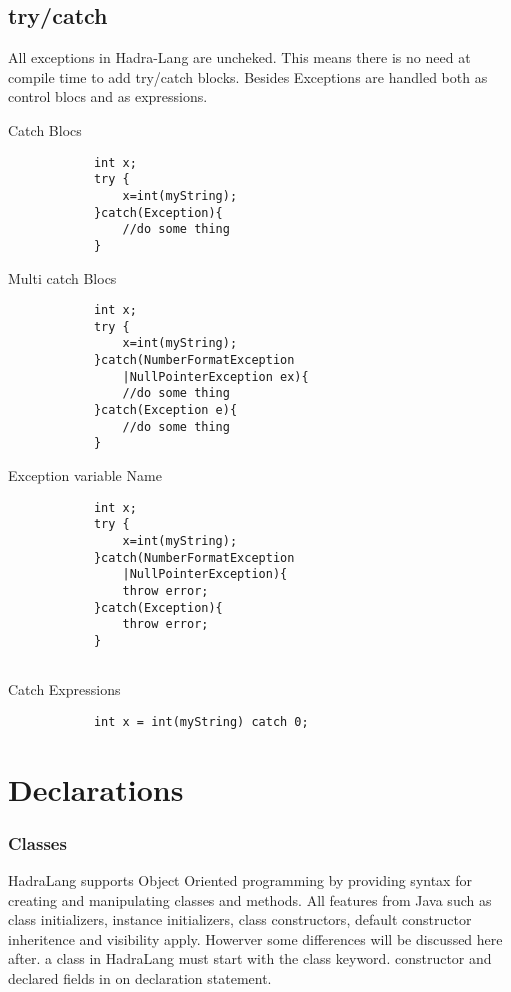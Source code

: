 \documentclass{tufte-book}
\begin{document}
            \section{try/catch}
            All exceptions in Hadra-Lang are uncheked. This means there is no need at compile time to add try/catch blocks. Besides Exceptions are handled both as control blocs and as expressions.

            Catch Blocs
            \begin{lstlisting}
            int x;
            try {
                x=int(myString);
            }catch(Exception){
                //do some thing
            }
            \end{lstlisting}


            Multi catch Blocs
            \begin{lstlisting}
            int x;
            try {
                x=int(myString);
            }catch(NumberFormatException
                |NullPointerException ex){
                //do some thing
            }catch(Exception e){
                //do some thing
            }
            \end{lstlisting}


            Exception variable Name
            \begin{lstlisting}
            int x;
            try {
                x=int(myString);
            }catch(NumberFormatException
                |NullPointerException){
                throw error;
            }catch(Exception){
                throw error;
            }
            
            \end{lstlisting}
            Catch Expressions
            \begin{lstlisting}
            int x = int(myString) catch 0;
            \end{lstlisting}
            
            \chapter{Declarations}
            \subsection{Classes}
            HadraLang supports Object Oriented programming by providing syntax for creating and manipulating classes and methods. All features from Java such as class initializers, instance initializers, class constructors, default constructor inheritence and visibility apply. Howerver some differences will be discussed here after.
            a class in HadraLang must start with the class keyword.
            constructor and  declared fields in on declaration statement.
\end{document}

